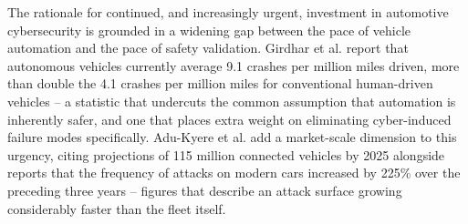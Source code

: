 \documentclass[journal]{IEEEtran}
\begin{document}
	The rationale for continued, and increasingly urgent, investment in
	automotive cybersecurity is grounded in a widening gap between the pace
	of vehicle automation and the pace of safety validation. Girdhar et al.
	report that autonomous vehicles currently average 9.1 crashes per million
	miles driven, more than double the 4.1 crashes per million miles for
	conventional human-driven vehicles \cite{ref1} -- a statistic that
	undercuts the common assumption that automation is inherently safer, and
	one that places extra weight on eliminating cyber-induced failure modes
	specifically. Adu-Kyere et al. add a market-scale dimension to this
	urgency, citing projections of 115 million connected vehicles by 2025
	alongside reports that the frequency of attacks on modern cars increased
	by 225\% over the preceding three years \cite{ref12} -- figures that
	describe an attack surface growing considerably faster than the fleet
	itself.
	
\end{document}
